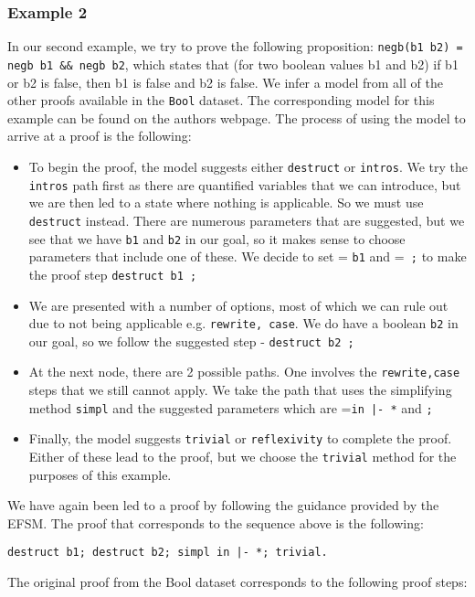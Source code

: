 \documentclass{llncs}
\begin{document}
\subsubsection{Example 2} In our second example, we try to prove the following proposition: \texttt{negb(b1  b2) = negb b1 \&\& negb b2}, which states that (for two boolean values b1 and b2) if b1 or b2 is false, then b1 is false and b2 is false. We infer a model from all of the other proofs available in the \texttt{Bool} dataset. The corresponding model for this example can be found on the authors webpage\footnotemark[1]. The process of using the model to arrive at a proof is the following:
\begin{itemize}
\item{To begin the proof, the model suggests either \texttt{destruct} or \texttt{intros}. We try the \texttt{intros} path first as there are quantified variables that we can introduce, but we are then led to a state where nothing is applicable. So we must use \texttt{destruct} instead. There are numerous parameters that are suggested, but we see that we have \texttt{b1} and \texttt{b2} in our goal, so it makes sense to choose parameters that include one of these. We decide to set  = \texttt{b1} and  =\texttt{ ;} to make the proof step \texttt{destruct b1 ;}}
\item{We are presented with a number of options, most of which we can rule out due to not being applicable e.g. \texttt{rewrite, case}. We do have a boolean \texttt{b2} in our goal, so we follow the suggested step - \texttt{destruct b2 ;} }
\item{At the next node, there are 2 possible paths. One involves the \texttt{rewrite,case} steps that we still cannot apply. We take the path that uses the simplifying method \texttt{simpl} and the suggested parameters which are  ={\tt in |- *} and  {\tt ;}}
\item{Finally, the model suggests {\tt trivial} or {\tt reflexivity} to complete the proof. Either of these lead to the proof, but we choose the {\tt trivial} method for the purposes of this example.}
\end{itemize}
We have again been led to a proof by following the guidance provided by the EFSM. The proof that corresponds to the sequence above is the following:

\vspace{2mm}
\noindent\texttt{destruct b1; destruct b2; simpl in |- *; trivial.}
\vspace{2mm}

\noindent The original proof from the Bool dataset corresponds to the following proof steps:
\end{document}
